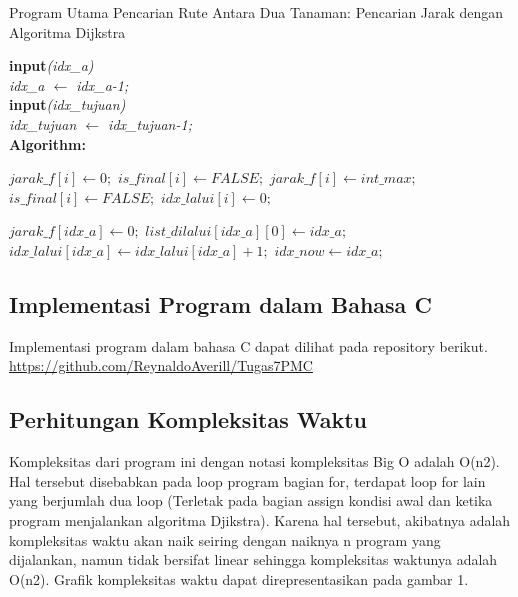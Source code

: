 \documentclass[conference]{IEEEtran}
\begin{document}
    \begin{algorithm}
        \caption{Program Utama Pencarian Rute Antara Dua Tanaman: Pencarian Jarak dengan Algoritma Dijkstra} 
        \textbf{input}\textit{(idx\_a)}\\
        \textit{idx\_a $\leftarrow$ idx\_a-1;}\\
        \textbf{input}\textit{(idx\_tujuan)}\\
        \textit{idx\_tujuan $\leftarrow$ idx\_tujuan-1;}\\
        \textbf{Algorithm: }

        \begin{algorithmic}[1]
                    \State $jarak\_f[i] \leftarrow 0;$
                    \State $is\_final[i] \leftarrow FALSE;$
                \Else
                    \State $jarak\_f[i] \leftarrow int\_max;$
                    \State $is\_final[i] \leftarrow FALSE;$
                    \State $idx\_lalui[i] \leftarrow 0;$

            \State $jarak\_f[idx\_a] \leftarrow 0;$
            \State $list\_dilalui[idx\_a][0] \leftarrow idx\_a;$
            \State $idx\_lalui[idx\_a] \leftarrow idx\_lalui[idx\_a]+1;$
            \State $idx\_now \leftarrow idx\_a;$

        \end{algorithmic}
    \end{algorithm}

    \subsection{Implementasi Program dalam Bahasa C}
    Implementasi program dalam bahasa C dapat dilihat pada repository berikut. \url{https://github.com/ReynaldoAverill/Tugas7PMC}

    \subsection{Perhitungan Kompleksitas Waktu}
    Kompleksitas dari program ini dengan notasi kompleksitas Big O adalah O(n2). Hal tersebut disebabkan pada loop program bagian for, terdapat loop for lain yang berjumlah dua loop (Terletak pada bagian assign kondisi awal dan ketika program menjalankan algoritma Djikstra). Karena hal tersebut, akibatnya adalah kompleksitas waktu akan naik seiring dengan naiknya n program yang dijalankan, namun tidak bersifat linear sehingga kompleksitas waktunya adalah O(n2). Grafik kompleksitas waktu dapat direpresentasikan pada gambar 1.
\end{document}
